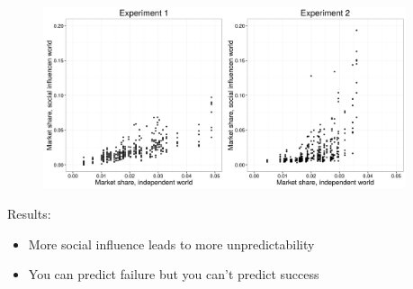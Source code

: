 \documentclass[aspectratio=169]{beamer}
\begin{document}
\begin{frame}

\setcounter{subfigure}{0}
\begin{figure}
  \centering
  \hspace{0in}
\end{figure}

\end{frame}
\begin{frame}

\begin{figure}
  \centering
   \includegraphics[width=0.95\textwidth]{figures/bitbybit4-23_salganik_experimental_2006_fig3ac}
\end{figure}

Results: \pause
\begin{itemize}
\item More social influence leads to more unpredictability
\pause
\item You can predict failure but you can't predict success
\end{itemize}
 
\end{frame}
\end{document}
